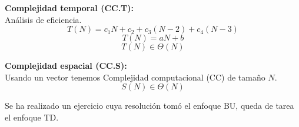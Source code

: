 \documentclass[tikz,11pt,fleqn]{book} %
\begin{document}
\begin{example}
\begin{enumerate}
    \textbf{Complejidad temporal (CC.T):\\}
    Análisis de eficiencia.
    $$ T(N)=c_1N+c_2+c_3(N-2)+c_4(N-3) $$
    $$ T(N)=aN+b $$
    $$ T(N)\in \Theta(N) $$

    \textbf{Complejidad espacial (CC.S):\\}
    Usando un vector tenemos Complejidad computacional (CC) de tamaño $N$.
    $$ S(N)\in\Theta(N) $$
    \end{enumerate}
\end{example}

Se ha realizado un ejercicio cuya resolución tomó el enfoque BU, queda de tarea el enfoque TD.

\end{document}
